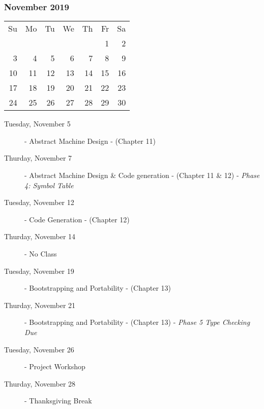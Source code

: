 \hrulefill

\subsubsection*{November 2019}
\begin{tabular}{rrrrrrr}
Su & Mo & Tu & We & Th & Fr & Sa\\
   &    &    &    &    &  1 &  2\\
 3 &  4 &  5 &  6 &  7 &  8 &  9\\
10 & 11 & 12 & 13 & 14 & 15 & 16\\
17 & 18 & 19 & 20 & 21 & 22 & 23\\
24 & 25 & 26 & 27 & 28 & 29 & 30\\
\end{tabular}
\begin{description}
\item[Tuesday, November 5]
    - Abstract Machine Design
    \newline - (Chapter 11)
\item[Thurday, November 7]
    - Abstract Machine Design \& Code generation
    \newline - (Chapter 11 \& 12)
    \newline - {\em Phase 4: Symbol Table}

\item[Tuesday, November 12]
    - Code Generation
    \newline - (Chapter 12)
\item[Thurday, November 14] - No Class

\item[Tuesday, November 19]
    - Bootstrapping and Portability
    \newline - (Chapter 13)
\item[Thurday, November 21]
    - Bootstrapping and Portability
    \newline - (Chapter 13)
    \newline - {\em Phase 5 Type Checking Due}

\item[Tuesday, November 26]
    - Project Workshop
\item[Thurday, November 28] - Thanksgiving Break
\end{description}

\hrulefill

